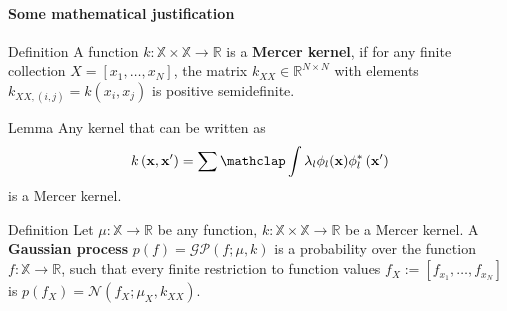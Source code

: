 \begin{frame}{\insertsection}
    \framesubtitle{Some mathematical justification}

    \begin{block}{Definition}
        A function $k:\mathbb{X}\times\mathbb{X} \rightarrow \mathbb{R}$ is a \textcolor{UniBlue}{\textbf{Mercer kernel}}, if for any finite collection $X=\left[x_{1}, \dots, x_{N}\right]$, the matrix $k_{X X} \in \mathbb{R}^{N \times N}$ with elements $k_{X X,(i, j)}=k\left(x_{i}, x_{j}\right)$ is positive semidefinite.
    \end{block}
    
    \begin{block}{Lemma}
        Any kernel that can be written as
        \begin{equation*}
            k\left(\mathbf{x}, \mathbf{x}^{\prime}\right)=\sum \mathclap \int \lambda_{l} \phi_{l}(\mathbf{x}) \phi_{l}^{*}\left(\mathbf{x}^{\prime}\right)
        \end{equation*}
        is a Mercer kernel.
    \end{block}

    \begin{block}{Definition}
        Let $\mu:\mathbb{X}\rightarrow \mathbb{R}$ be any function, $k:\mathbb{X}\times\mathbb{X} \rightarrow \mathbb{R}$ be a Mercer kernel. A \textcolor{UniBlue}{\textbf{Gaussian process}} $p(f)=\mathcal{G} \mathcal{P}(f ; \mu, k)$ is a probability over the function $f : \mathbb{X} \rightarrow \mathbb{R}$, such that every finite restriction to function values $f_{X} :=\left[f_{x_{1}}, \ldots, f_{x_{N}}\right]$ is  $p\left(f_{X}\right)=\mathcal{N}\left(f_{X} ; \mu_{X}, k_{X X}\right)$.
    \end{block}




\end{frame}
